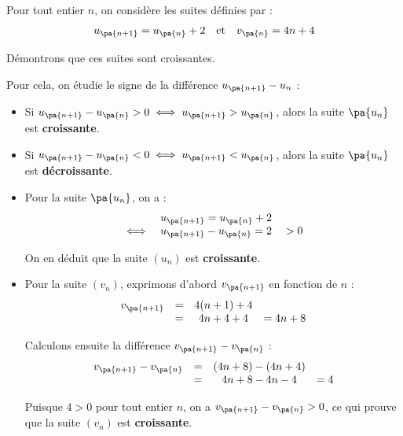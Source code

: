 \begin{methode}
	Pour tout entier $n$, on considère les suites définies par :
	\[
		u_{\pa{n+1}} = u_{\pa{n}} + 2 \quad\text{et}\quad v_{\pa{n}} = 4n + 4
	\]

	Démontrons que ces suites sont croissantes.

	Pour cela, on étudie le signe de la différence $u_{\pa{n+1}} - u_n$ :
	\begin{itemize}
		\item Si $u_{\pa{n+1}} - u_{\pa{n}} > 0 \iff u_{\pa{n+1}} > u_{\pa{n}}$, alors la suite $\pa{u_n}$ est \textbf{croissante}.
		\item Si $u_{\pa{n+1}} - u_{\pa{n}} < 0 \iff u_{\pa{n+1}} < u_{\pa{n}}$, alors la suite $\pa{u_n}$ est \textbf{décroissante}.
	\end{itemize}

	\begin{correction}
		\nline
		\begin{itemize}
			\item Pour la suite $\pa{u_n}$, on a :
			      \[
				      \begin{array}{rl}
					           & u_{\pa{n+1}} = u_{\pa{n}} + 2           \\
					      \iff & u_{\pa{n+1}} - u_{\pa{n}} = 2 \quad > 0
				      \end{array}
			      \]

			      On en déduit que la suite $(u_{n})$ est \textbf{croissante}.

			\item Pour la suite $(v_n)$, exprimons d'abord $v_{\pa{n+1}}$ en fonction de $n$ :
			      \[
				      \begin{array}{rccl}
					      v_{\pa{n+1}} & = & 4(n+1) + 4 &          \\
					                   & = & 4n + 4 + 4 & = 4n + 8
				      \end{array}
			      \]

			      Calculons ensuite la différence $v_{\pa{n+1}} - v_{\pa{n}}$ :
			      \[
				      \begin{array}{rccl}
					      v_{\pa{n+1}} - v_{\pa{n}} & = & (4n + 8) - (4n + 4) &     \\
					                                & = & 4n + 8 - 4n - 4     & = 4
				      \end{array}
			      \]

			      Puisque $4 > 0$ pour tout entier $n$, on a $v_{\pa{n+1}} - v_{\pa{n}} > 0$, ce qui prouve que la suite $(v_{n})$ est \textbf{croissante}.
		\end{itemize}
	\end{correction}
\end{methode}


